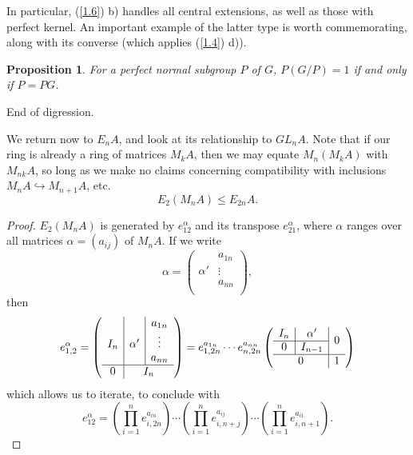 \documentclass[openany,leqno]{book}  %
\newtheorem{prop}[theorem]{Proposition}
\begin{document}
In particular, (\ref{1.6}) b) handles all central extensions, as well as those with perfect kernel. An important example of the latter type is worth commemorating, along with its converse (which applies (\ref{1.4}) d)).
\begin{prop}
For a perfect normal subgroup $P$ of $G$, $P(G/P)=1$ if and only if $P=PG$.
\end{prop}
End of digression.

We return now to $E_n A$, and look at its relationship to $GL_nA$. Note that if our ring is already a ring of matrices $M_kA$, then we may equate $M_n(M_k A)$ with $M_{nk}A$, so long as we make no claims concerning compatibility with inclusions $M_nA\hookrightarrow M_{n+1}A$, etc.\ 
\begin{equation}
  E_2(M_nA)\leqslant E_{2n}A.
\end{equation}

\begin{proof}
$E_2(M_nA)$ is generated by $e_{12}^\alpha$ and its transpose $e_{21}^\alpha$, where $\alpha$ ranges over all matrices
$\alpha=(a_{ij})$ of $M_nA$. If we write
\[\alpha=\left(
\begin{array}{c|c}
 & a_{1n}\\
\alpha' &\vdots\\
& a_{nn}\\
\end{array}\right), \]
then
\[e_{1,2}^{\alpha}=\left(
\begin{array}{c|c|c}
 & & a_{1n}\\
I_n& \alpha' &\vdots\\
& & a_{nn}\\
\hline
0& \multicolumn{2}{c}{I_n}
\end{array}\right)=e_{1,2n}^{a_{1n}}\cdots e_{n,2n}^{a_{nn}}\left(
\begin{array}{c|c|c}
I_n & \alpha'& \multirow{2}*{0}\\
\cline{1-2}
0&I_{n-1} & \\
\hline
\multicolumn{2}{c|}{0}& 1\\
\end{array}\right) \]
which allows us to iterate, to conclude with
\[e_{12}^{\alpha}=(\prod_{i=1}^n e_{i,2n}^{a_{in}})\cdots(\prod_{i=1}^n e_{i,n+j}^{a_{ij}})\cdots(\prod_{i=1}^n e_{i,n+1}^{a_{i1}}).\]
\end{proof}
\end{document}
